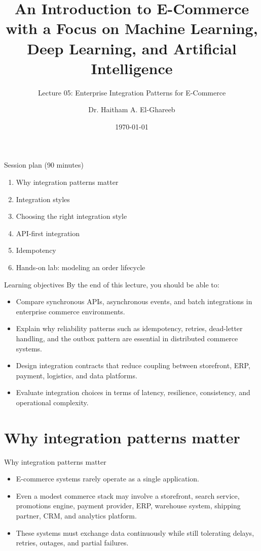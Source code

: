 \documentclass[aspectratio=169]{beamer}
\title[Lecture 05]{An Introduction to E-Commerce\\\small with a Focus on Machine Learning, Deep Learning, and Artificial Intelligence}
\subtitle{Lecture 05: Enterprise Integration Patterns for E-Commerce}
\author{Dr. Haitham A. El-Ghareeb}
\institute{Faculty of Computers and Information Sciences \\ Mansoura University \\ Egypt}
\date{\today}
\begin{document}
\begin{frame}
  \titlepage
\end{frame}

\begin{frame}{Session plan (90 minutes)}
  \begin{enumerate}
    \item Why integration patterns matter
    \item Integration styles
    \item Choosing the right integration style
    \item API-first integration
    \item Idempotency
    \item Hands-on lab: modeling an order lifecycle
  \end{enumerate}
\end{frame}

\begin{frame}{Learning objectives}
  By the end of this lecture, you should be able to:
  \begin{itemize}
    \item Compare synchronous APIs, asynchronous events, and batch integrations in enterprise commerce environments.
    \item Explain why reliability patterns such as idempotency, retries, dead-letter handling, and the outbox pattern are essential in distributed commerce systems.
    \item Design integration contracts that reduce coupling between storefront, ERP, payment, logistics, and data platforms.
    \item Evaluate integration choices in terms of latency, resilience, consistency, and operational complexity.
  \end{itemize}
\end{frame}

\section{Why integration patterns matter}

\begin{frame}{Why integration patterns matter}
  \begin{itemize}
    \item E-commerce systems rarely operate as a single application.
    \item Even a modest commerce stack may involve a storefront, search service, promotions engine, payment provider, ERP, warehouse system, shipping partner, CRM, and analytics platform.
    \item These systems must exchange data continuously while still tolerating delays, retries, outages, and partial failures.
  \end{itemize}
\end{frame}
\end{document}
